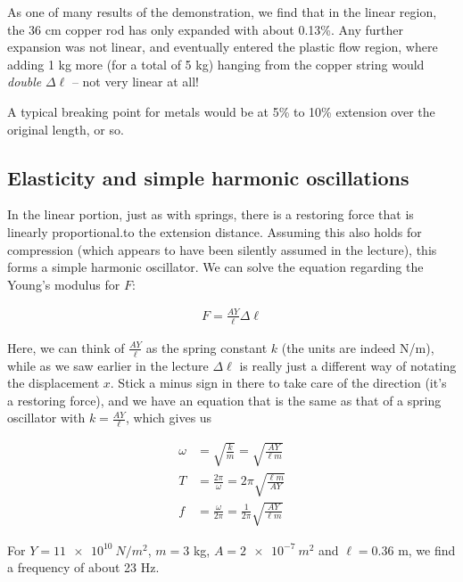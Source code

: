 As one of many results of the demonstration, we find that in the linear region, the 36 cm copper rod has only expanded with about 0.13\%. Any further expansion was not linear, and eventually entered the plastic flow region, where adding 1 kg more (for a total of 5 kg) hanging from the copper string would \emph{double} $\Delta \ell$ -- not very linear at all!

A typical breaking point for metals would be at 5\% to 10\% extension over the original length, or so.

\subsection{Elasticity and simple harmonic oscillations}

In the linear portion, just as with springs, there is a restoring force that is linearly proportional.to the extension distance. Assuming this also holds for compression (which appears to have been silently assumed in the lecture), this forms a simple harmonic oscillator. We can solve the equation regarding the Young's modulus for $F$:

\begin{align}
F = \frac{A Y}{\ell} \Delta \ell
\end{align}

Here, we can think of $\displaystyle \frac{A Y}{\ell}$ as the spring constant $k$ (the units are indeed N/m), while as we saw earlier in the lecture $\Delta \ell$ is really just a different way of notating the displacement $x$. Stick a minus sign in there to take care of the direction (it's a restoring force), and we have an equation that is the same as that of a spring oscillator with $\displaystyle k = \frac{A Y}{\ell}$, which gives us

\begin{align}
\omega &= \sqrt{\frac{k}{m}} = \sqrt{\frac{A Y}{\ell m}}\\
T &= \frac{2 \pi}{\omega} = 2 \pi \sqrt{\frac{\ell m}{A Y}}\\
f &= \frac{\omega}{2 \pi} = \frac{1}{2\pi} \sqrt{\frac{A Y}{\ell m}}
\end{align}

For $Y = \SI{11e10}{N/m^2}$, $m = 3$ kg, $A = \SI{2e-7}{m^2}$ and $\ell = 0.36$ m, we find a frequency of about 23 Hz.
